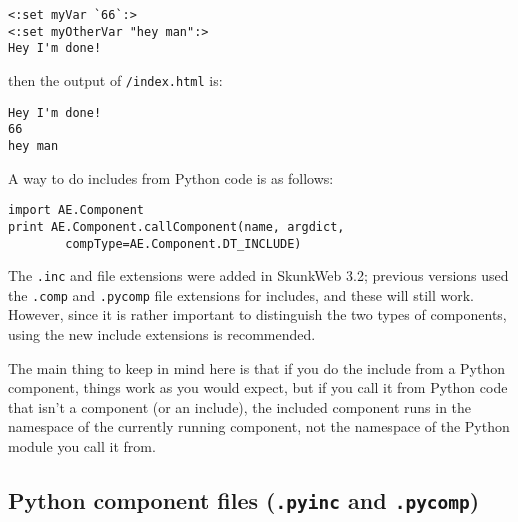 \documentclass{manual}
\begin{document}
\begin{verbatim}<:set myVar `66`:>
<:set myOtherVar "hey man":>
Hey I'm done!
\end{verbatim}

then the output of \texttt{/index.html} is:

\begin{verbatim}Hey I'm done!
66
hey man
\end{verbatim}

A way to do includes from Python code is as follows:
\begin{verbatim}
import AE.Component
print AE.Component.callComponent(name, argdict, 
        compType=AE.Component.DT_INCLUDE)
\end{verbatim}

 The \texttt{.inc} and  file
extensions were added in SkunkWeb 3.2; previous versions used the
\texttt{.comp} and \texttt{.pycomp} file extensions for includes, and
these will still work.  However, since it is rather important to
distinguish the two types of components, using the new include
extensions is recommended.


 The main thing to keep in mind here is that if you do
the include from a Python component, things work as you would expect,
but if you call it from Python code that isn't a component (or an
include), the included component runs in the namespace of the
currently running component, not the namespace of the Python module
you call it from.


\subsection{Python component files (\texttt{.pyinc} and \texttt{.pycomp})}
\end{document}
